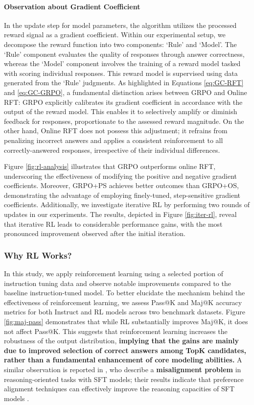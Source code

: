 \begin{itemize}[topsep=0pt]
\begin{itemize}[topsep=0pt]
\paragraph{Observation about Gradient Coefficient} In the update step for model parameters, the algorithm utilizes the processed reward signal as a gradient coefficient. Within our experimental setup, we decompose the reward function into two components: `Rule' and `Model'. The `Rule' component evaluates the quality of responses through answer correctness, whereas the `Model' component involves the training of a reward model tasked with scoring individual responses. This reward model is supervised using data generated from the `Rule' judgments. As highlighted in Equations \ref{eq:GC-RFT} and \ref{eq:GC-GRPO}, a fundamental distinction arises between GRPO and Online RFT: GRPO explicitly calibrates its gradient coefficient in accordance with the output of the reward model. This enables it to selectively amplify or diminish feedback for responses, proportionate to the assessed reward magnitude. On the other hand, Online RFT does not possess this adjustment; it refrains from penalizing incorrect answers and applies a consistent reinforcement to all correctly-answered responses, irrespective of their individual differences.

Figure \ref{fig:rl-analysis} illustrates that GRPO outperforms online RFT, underscoring the effectiveness of modifying the positive and negative gradient coefficients. Moreover, GRPO+PS achieves better outcomes than GRPO+OS, demonstrating the advantage of employing finely-tuned, step-sensitive gradient coefficients. Additionally, we investigate iterative RL by performing two rounds of updates in our experiments. The results, depicted in Figure \ref{fig:iter-rl}, reveal that iterative RL leads to considerable performance gains, with the most pronounced improvement observed after the initial iteration.

\subsubsection{Why RL Works?} In this study, we apply reinforcement learning using a selected portion of instruction tuning data and observe notable improvements compared to the baseline instruction-tuned model. To better elucidate the mechanism behind the effectiveness of reinforcement learning, we assess Pass@K and Maj@K accuracy metrics for both Instruct and RL models across two benchmark datasets. Figure \ref{fig:maj-pass} demonstrates that while RL substantially improves Maj@K, it does not affect Pass@K. This suggests that reinforcement learning increases the robustness of the output distribution, \textbf{implying that the gains are mainly due to improved selection of correct answers among TopK candidates, rather than a fundamental enhancement of core modeling abilities.} A similar observation is reported in \citep{wang2023making}, who describe a \textbf{misalignment problem} in reasoning-oriented tasks with SFT models; their results indicate that preference alignment techniques can effectively improve the reasoning capacities of SFT models \citep{yuan2023rrhf,song2023preference,wang2023making}.


\end{itemize}
\end{itemize}
